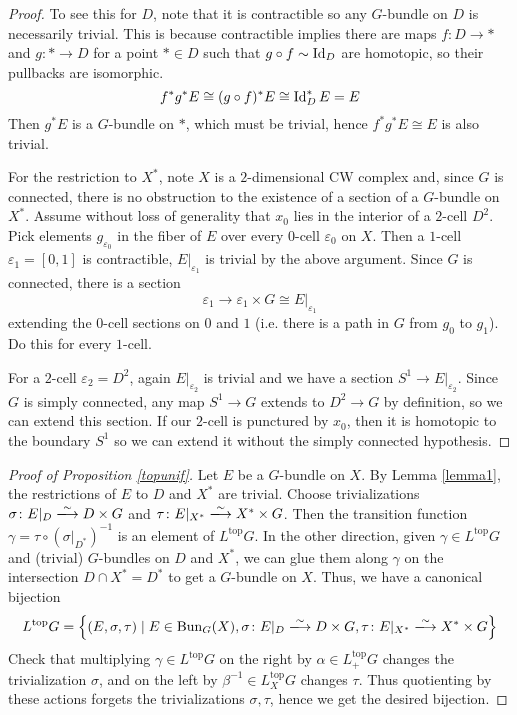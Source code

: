 \documentclass[12pt]{article}
\begin{document}
\begin{proof}

To see this for $D$, note that it is contractible so any $G$-bundle on $D$ is necessarily trivial. This is because contractible implies there are maps $f \colon D \to *$ and $g \colon * \to D$ for a point $* \in D$ such that $g \circ f \sim \operatorname{Id}_D$ are homotopic, so their pullbacks are isomorphic.
    \[f^* g^* E \cong (g \circ f)^* E \cong \operatorname{Id}_D^* E = E \]
    Then $g^*E$ is a $G$-bundle on $*$, which must be trivial, hence $f^* g^* E \cong E$ is also trivial. 

    For the restriction to $X^*$, note $X$ is a $2$-dimensional CW complex and, since $G$ is connected, there is no obstruction to the existence of a section of a $G$-bundle on $X^*$. Assume without loss of generality that $x_0$ lies in the interior of a $2$-cell $D^2$. Pick elements $g_{\varepsilon_0}$ in the fiber of $E$ over every $0$-cell $\varepsilon_0$ on $X$. Then a $1$-cell $\varepsilon_1 = [0,1]$ is contractible, $E\vert_{\varepsilon_1}$ is trivial by the above argument. Since $G$ is connected, there is a section
    \[\varepsilon_1 \to \varepsilon_1 \times G \cong E\vert_{\varepsilon_1}\] 
    extending the $0$-cell sections on $0$ and $1$ (i.e. there is a path in $G$ from $g_0$ to $g_1$). Do this for every $1$-cell. 
    
    For a $2$-cell $\varepsilon_2 = D^2$, again $E \vert_{\varepsilon_2}$ is trivial and we have a section $S^1 \to E \vert_{\varepsilon_2}$. Since $G$ is simply connected, any map $S^1 \to G$ extends to $D^2 \to G$ by definition, so we can extend this section. If our $2$-cell is punctured by $x_0$, then it is homotopic to the boundary $S^1$ so we can extend it without the simply connected hypothesis.
\end{proof}

\begin{proof}[Proof of Proposition \ref{topunif}]
        Let $E$ be a $G$-bundle on $X$. By Lemma \ref{lemma1}, the restrictions of $E$ to $D$ and $X^*$ are trivial. Choose trivializations $\sigma \colon E \vert_D \xlongrightarrow{\sim} D \times G$ and $\tau \colon E \vert_{X^*} \xlongrightarrow{\sim} X^* \times G$. Then the transition function $\gamma = \tau \circ (\sigma\vert_{D^*})^{-1}$ is an element of $L^{\text{top}} G$. In the other direction, given $\gamma \in L^{\text{top}} G$ and (trivial) $G$-bundles on $D$ and $X^*$, we can glue them along $\gamma$ on the intersection $D \cap X^* = D^*$ to get a $G$-bundle on $X$. Thus, we have a canonical bijection
        \[L^{\text{top}}G = \left\{(E, \sigma, \tau) \mid E \in \Bun_G(X), \sigma \colon E \vert_D \xlongrightarrow{\sim} D \times G, \tau \colon E \vert_{X^*} \xlongrightarrow{\sim} X^* \times G\right\}\]
        Check that multiplying $\gamma \in L^{\text{top}}G$ on the right by $\alpha \in L^{\text{top}}_+ G$ changes the trivialization $\sigma$, and on the left by $\beta^{-1} \in L^{\text{top}}_X G$ changes $\tau$. Thus quotienting by these actions forgets the trivializations $\sigma, \tau$, hence we get the desired bijection.
\end{proof}
\end{document}
